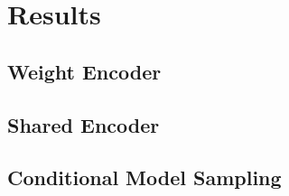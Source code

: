 \chapter{Results}
\label{chap:results}






\section{Weight Encoder}
\label{sec:weights}

\section{Shared Encoder}
\label{sec:shared}





\section{Conditional Model Sampling}
\label{sec:conditional_model_sample}

